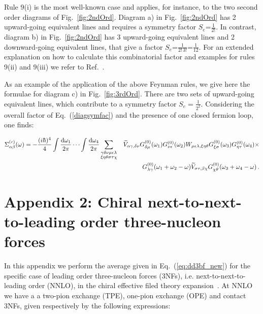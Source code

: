  Rule 9(i)  is the most well-known case and applies, for instance, to the two second order diagrams 
 of Fig.~\ref{fig:2ndOrd}. Diagram a) in Fig.~\ref{fig:2ndOrd} has 2 upward-going equivalent lines and requires a symmetry factor $S_e$=$\frac1{2!}$. In contrast, diagram b) in Fig.~\ref{fig:2ndOrd} has 3 upward-going equivalent lines and 2 downward-going equivalent lines, that give a factor $S_e$=$\frac1{2! \, 3!}$=$\frac1{12}$. For an extended explanation on how to calculate this combinatorial factor and examples for rules 9(ii) and 9(iii) we refer to Ref.~\cite{ch11_Carbone2013Nov}.
 
 As an example of the application of the above Feynman rules, we give here the formulae for diagram c) in Fig.~\ref{fig:3rdOrd}. There are two sets of upward-going equivalent lines, which contribute to a
symmetry factor $S_e=\frac{1}{2^2}$. Considering the overall factor of Eq.~(\ref{diagsymfac}) and the
presence of one closed fermion loop, one finds:

\begin{eqnarray}
\Sigma^{(c)}_{\alpha \beta}(\omega)=
- \frac{(i \hbar)^{4} }{4}
%
\int\frac{{\rm d}\omega_1}{2\pi} \cdots \int\frac{{\rm d}\omega_4}{2\pi}
\sum_{\substack{ \gamma\delta\nu \mu\epsilon\lambda \\ \xi\eta\theta \sigma\tau\chi}} 
&&
\widetilde{V}_{\alpha\gamma,\delta\nu}G^{(0)}_{\delta\mu}(\omega_1)G^{(0)}_{\nu\epsilon}(\omega_2) 
W_{\mu\epsilon\lambda,\xi\eta\theta}G^{(0)}_{\xi\sigma}(\omega_3)G^{(0)}_{\eta\tau}(\omega_4) \times 
\nonumber\\ &&
G^{(0)}_{\lambda\gamma}(\omega_1+\omega_2-\omega)
\widetilde{V}_{\sigma\tau,\beta\chi}
G^{(0)}_{\chi\theta}(\omega_3+\omega_4-\omega)  \, .
\end{eqnarray}


\section*{Appendix 2: Chiral next-to-next-to-leading order three-nucleon forces}
\label{app:scgf_3NF}

In this appendix we perform the average given in Eq.~(\ref{eq:dd3bf_new}) for the specific case of leading order three-nucleon forces (3NFs), i.e. next-to-next-to-leading order (NNLO), in the chiral effective filed theory expansion~\cite{ch11_vKol1994,ch11_Epelbaum2002Dec2}. At NNLO we have a a two-pion exchange (TPE), one-pion exchange (OPE) and contact 3NFs, given respectively by the following expressions:

